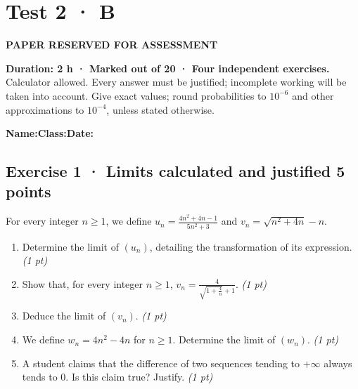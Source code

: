 \fi

\fi

\ifprof

\clearpage{}\label{sujet:2-4}

\section*{Test 2 · B}

{\sffamily\bfseries\color{amber}PAPER RESERVED FOR ASSESSMENT\par}

\textbf{Duration: 2 h · Marked out of 20 · Four independent exercises.}\\Calculator allowed. Every answer must be justified; incomplete working will be taken into account. Give exact values; round probabilities to $10^{-6}$ and other approximations to $10^{-4}$, unless stated otherwise.

\smallskip\textbf{Name:}\enspace\dotfill\quad\textbf{Class:}\enspace\dotfill\quad\textbf{Date:}\enspace\dotfill

\subsection*{Exercise 1 · Limits calculated and justified \hfill 5 points}For every integer $n\ge1$, we define $u_n=\frac{4n^2+4n-1}{5n^2+3}$ and $v_n=\sqrt{n^2+4n}-n$.

\begin{enumerate}

\item Determine the limit of $(u_n)$, detailing the transformation of its expression. \hfill\textit{(1 pt)}

\item Show that, for every integer $n\ge1$, $v_n=\frac{4}{\sqrt{1+\frac{4}n}+1}$. \hfill\textit{(1 pt)}

\item Deduce the limit of $(v_n)$. \hfill\textit{(1 pt)}

\item We define $w_n=4n^2-4n$ for $n\ge1$. Determine the limit of $(w_n)$. \hfill\textit{(1 pt)}

\item A student claims that the difference of two sequences tending to $+\infty$ always tends to $0$. Is this claim true? Justify. \hfill\textit{(1 pt)}

\end{enumerate}

